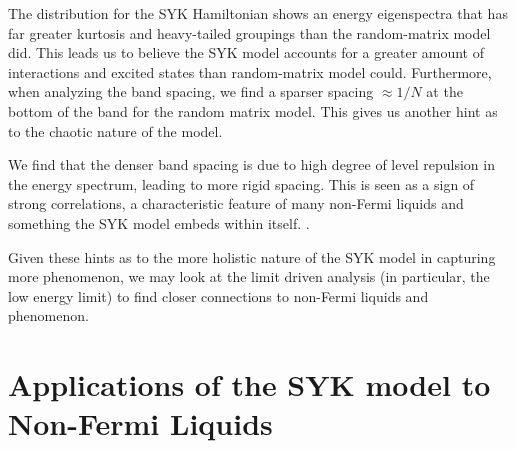 \documentclass[reprint]{revtex4-2}
\begin{document}
The distribution for the SYK Hamiltonian shows an energy eigenspectra that has far greater kurtosis and heavy-tailed groupings than the random-matrix model did. This leads us to believe the SYK model accounts for a greater amount of interactions and excited states than random-matrix model could. Furthermore, when analyzing the band spacing, we find a sparser spacing $\approx 1/N$ at the bottom of the band for the random matrix model. This gives us another hint as to the chaotic nature of the model. 
\par We find that the denser band spacing is due to high degree of level repulsion in the energy spectrum, leading to more rigid spacing. This is seen as a sign of strong correlations, a characteristic feature of many non-Fermi liquids and something the SYK model embeds within itself. \cite{Orman:2024mpw}. 
\par Given these hints as to the more holistic nature of the SYK model in capturing more phenomenon, we may look at the limit driven analysis (in particular, the low energy limit) to find closer connections to non-Fermi liquids and phenomenon. 


\section{Applications of the SYK model to Non-Fermi Liquids}
\end{document}
